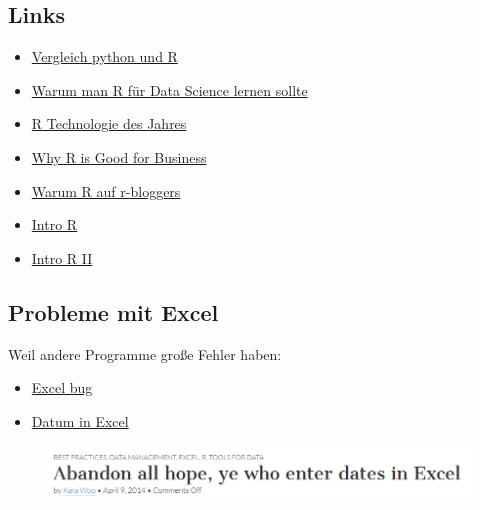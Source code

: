 \documentclass[]{article}
\begin{document}
\subsection{Links}\label{links}

\begin{itemize}
\item
  \href{http://www.dataschool.io/python-or-r-for-data-science/}{Vergleich
  python und R}
\item
  \href{http://www.r-bloggers.com/why-you-should-learn-r-first-for-data-science/}{Warum
  man R für Data Science lernen sollte}
\item
  \href{http://www.r-bloggers.com/rstudio-infoworld-2015-technology-of-the-year-award-recipient/}{R
  Technologie des Jahres}
\item
  \href{http://www.fastcolabs.com/3030063/why-the-r-programming-language-is-good-for-business}{Why
  R is Good for Business}
\item
  \href{http://www.r-bloggers.com/why-use-r/}{Warum R auf r-bloggers}
\item
  \href{http://www.ats.ucla.edu/stat/r/seminars/intro.htm}{Intro R}
\item
  \href{http://www.ats.ucla.edu/stat/r/sk/}{Intro R II}
\end{itemize}

\subsection{Probleme mit Excel}\label{probleme-mit-excel}

Weil andere Programme große Fehler haben:

\begin{itemize}
\item
  \href{http://blog.revolutionanalytics.com/2013/02/did-an-excel-error-bring-down-the-london-whale.html}{Excel
  bug}
\item
  \href{https://coffeehouse.dataone.org/2014/04/09/abandon-all-hope-ye-who-enter-dates-in-excel/}{Datum
  in Excel}
\end{itemize}

\begin{figure}[htbp]
\centering
\includegraphics{figure/Abandon.PNG}
\caption{}
\end{figure}
\end{document}
